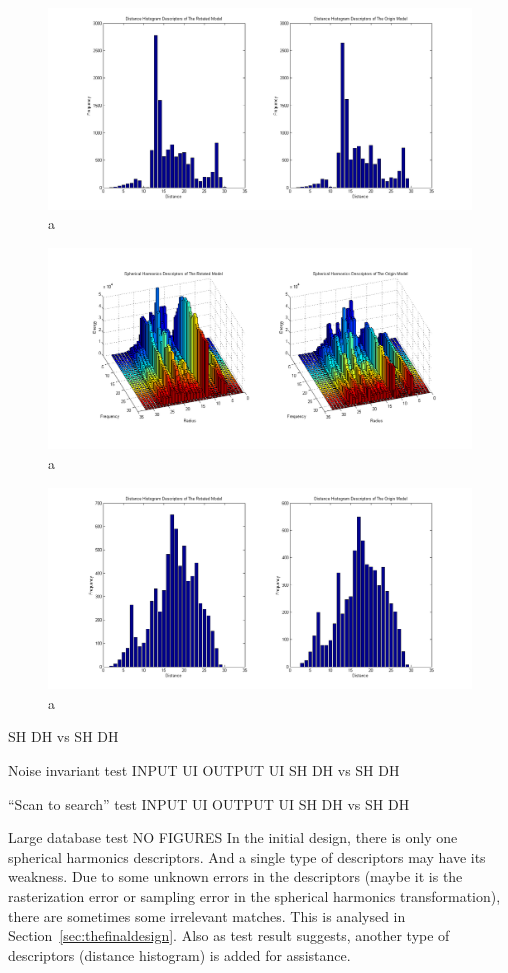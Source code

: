 \begin{enumerate}
\begin{figure}[h]
\centering
\includegraphics[width=0.7\linewidth]{rotationinvariant_test_DH10}
\caption{a} \label{rotationinvariant_test_DH10}
\end{figure}

\begin{figure}[h]
\centering
\includegraphics[width=0.7\linewidth]{rotationinvariant_test_SH32}
\caption{a} \label{rotationinvariant_test_SH32}
\end{figure}

\begin{figure}[h]
\centering
\includegraphics[width=0.7\linewidth]{rotationinvariant_test_DH32}
\caption{a} \label{rotationinvariant_test_DH32}
\end{figure}



SH  DH   vs SH DH

Noise invariant test
INPUT UI
OUTPUT UI
SH  DH   vs SH DH

``Scan to search'' test 
INPUT UI
OUTPUT UI
SH  DH   vs   SH DH

Large database test
NO FIGURES
In the initial design, there is only one spherical harmonics descriptors. And a single type of descriptors may have its weakness. Due to some unknown errors in the descriptors (maybe it is the rasterization error or sampling error in the spherical harmonics transformation), there are sometimes some irrelevant matches. This is analysed in Section~\ref{sec:thefinaldesign}.  Also as test result suggests, another type of descriptors (distance histogram) is added for assistance. 

\end{enumerate}
